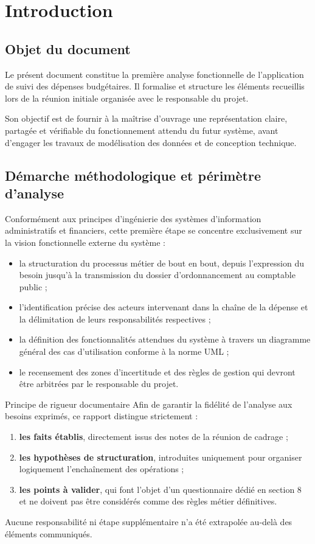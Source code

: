\section{Introduction}

\subsection{Objet du document}

Le présent document constitue la première analyse fonctionnelle de l'application de suivi des dépenses budgétaires. Il formalise et structure les éléments recueillis lors de la réunion initiale organisée avec le responsable du projet.

Son objectif est de fournir à la maîtrise d'ouvrage une représentation claire, partagée et vérifiable du fonctionnement attendu du futur système, avant d'engager les travaux de modélisation des données et de conception technique.

\subsection{Démarche méthodologique et périmètre d'analyse}

Conformément aux principes d'ingénierie des systèmes d'information administratifs et financiers, cette première étape se concentre exclusivement sur la vision fonctionnelle externe du système :

\begin{itemize}
  \item la structuration du processus métier de bout en bout, depuis l'expression du besoin jusqu'à la transmission du dossier d'ordonnancement au comptable public ;
  \item l'identification précise des acteurs intervenant dans la chaîne de la dépense et la délimitation de leurs responsabilités respectives ;
  \item la définition des fonctionnalités attendues du système à travers un diagramme général des cas d'utilisation conforme à la norme UML ;
  \item le recensement des zones d'incertitude et des règles de gestion qui devront être arbitrées par le responsable du projet.
\end{itemize}

\begin{encadre}{Principe de rigueur documentaire}
Afin de garantir la fidélité de l'analyse aux besoins exprimés, ce rapport distingue strictement :
\begin{enumerate}
  \item \textbf{les faits établis}, directement issus des notes de la réunion de cadrage ;
  \item \textbf{les hypothèses de structuration}, introduites uniquement pour organiser logiquement l'enchaînement des opérations ;
  \item \textbf{les points à valider}, qui font l'objet d'un questionnaire dédié en section 8 et ne doivent pas être considérés comme des règles métier définitives.
\end{enumerate}
Aucune responsabilité ni étape supplémentaire n'a été extrapolée au-delà des éléments communiqués.
\end{encadre}
